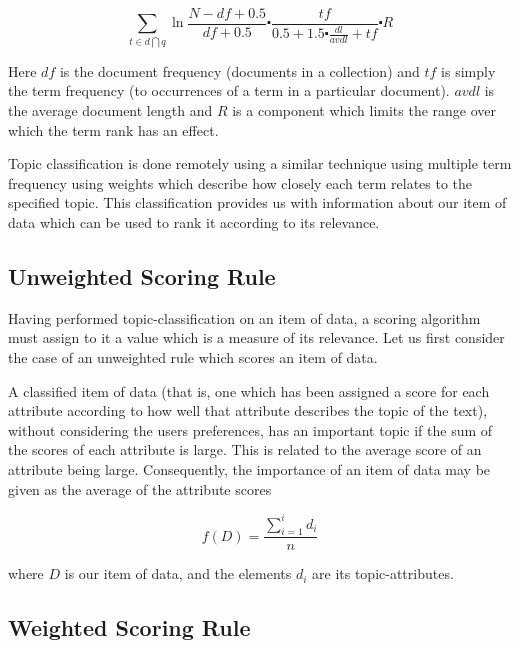 \begin{equation}\label{OkapiBM25}
	\sum\limits_{t\in d \bigcap q} \ln{\frac{N-df+0.5}{df+0.5}}\centerdot \frac{tf}{0.5+1.5 \centerdot \frac{dl}{avdl}+tf} \centerdot R
\end{equation}

Here $df$ is the document frequency (documents in a collection) and $tf$ is simply the term frequency (to occurrences of a term in a particular document). $avdl$ is the average document length and $R$ is a component which limits the range over which the term rank has an effect. 

Topic classification is done remotely using a similar technique using multiple term frequency using weights which describe how closely each term relates to the specified topic. This classification provides us with information about our item of data which can be used to rank it according to its relevance. 

\subsection{Unweighted Scoring Rule}

Having performed topic-classification on an item of data, a scoring algorithm must assign to it a value which is a measure of its relevance. Let us first consider the case of an unweighted rule which scores an item of data. 

A classified item of data (that is, one which has been assigned a score for each attribute according to how well that attribute describes the topic of the text), without considering the users preferences, has an important topic if the sum of the scores of each attribute is large. This is related to the average score of an attribute being large. Consequently, the importance of an item of data may be given as the average of the attribute scores

\begin{equation}\label{AverageUnweightedRule}	
	f(D) = \frac{\sum_{i=1}^{i} d_i}{n}
\end{equation}

where $D$ is our item of data, and the elements $d_i$ are its topic-attributes. 

\subsection{Weighted Scoring Rule}

